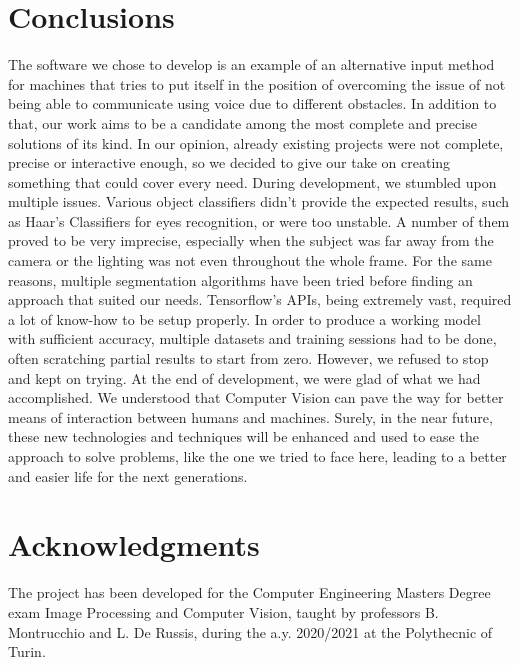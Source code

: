 \documentclass[a4paper, 12pt]{article}
\begin{document}
\section{Conclusions}
\label{Conclusions}
The software we chose to develop is an example of an alternative input method for machines that tries to put itself in the position of overcoming the issue of not being able to communicate using voice due to different obstacles. In addition to that, our work aims to be a candidate among the most complete and precise solutions of its kind. In our opinion, already existing projects were not complete, precise or interactive enough, so we decided to give our take on creating something that could cover every need.\linebreak
During development, we stumbled upon multiple issues.
Various object classifiers didn't provide the expected results, such as Haar’s Classifiers for eyes recognition, or were too unstable. A number of them proved to be very imprecise, especially when the subject was far away from the camera or the lighting was not even throughout the whole frame.
For the same reasons, multiple segmentation algorithms have been tried before finding an approach that suited our needs.
Tensorflow's APIs, being extremely vast, required a lot of know-how to be setup properly. In order to produce a working model with sufficient accuracy, multiple datasets and training sessions had to be done, often scratching partial results to start from zero.
However, we refused to stop and kept on trying.
At the end of development, we were glad of what we had accomplished. We understood that Computer Vision can pave the way for better means of interaction between humans and machines.\linebreak
Surely, in the near future, these new technologies and techniques will be enhanced and used to ease the approach to solve problems, like the one we tried to face here, leading to a better and easier life for the next generations.

\section{Acknowledgments}
\label{Acks}
The project has been developed for the Computer Engineering Masters Degree exam Image Processing and Computer Vision, taught by professors B. Montrucchio and L. De Russis, during the a.y. 2020/2021 at the Polythecnic of Turin.

\onecolumn
\end{document}
